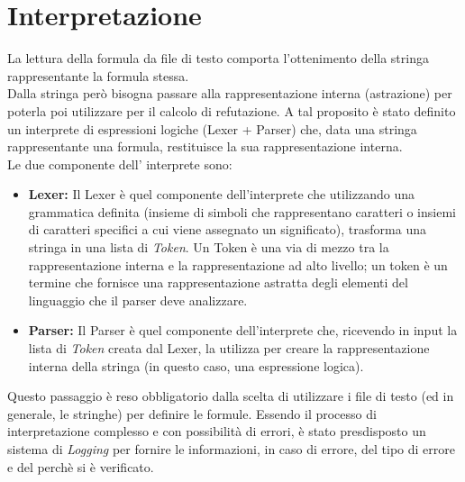 \documentclass[\main/tesi.tex]{subfiles}
\begin{document}
\section{Interpretazione}
La lettura della formula da file di testo comporta l'ottenimento della stringa rappresentante la formula stessa. \\
Dalla stringa però bisogna passare alla rappresentazione interna (astrazione) per poterla poi utilizzare per il calcolo di refutazione. A tal proposito è stato definito un interprete di espressioni logiche (Lexer + Parser) che, data una stringa rappresentante una formula, restituisce la sua rappresentazione interna. \\
Le due componente dell' interprete sono:
\begin{itemize}
  \item \textbf{Lexer:} Il Lexer è quel componente dell'interprete che utilizzando una grammatica definita (insieme di simboli che rappresentano caratteri o insiemi di caratteri specifici a cui viene assegnato un significato), trasforma una stringa in una lista di \textit{Token}. Un Token è una via di mezzo tra la rappresentazione interna e la rappresentazione ad alto livello; un token è un termine che fornisce una rappresentazione astratta degli elementi del linguaggio che il parser deve analizzare.
  \item \textbf{Parser:} Il Parser è quel componente dell'interprete che, ricevendo in input la lista di \textit{Token} creata dal Lexer, la utilizza per creare la rappresentazione interna della stringa (in questo caso, una espressione logica).
\end{itemize}
Questo passaggio è reso obbligatorio dalla scelta di utilizzare i file di testo (ed in generale, le stringhe) per definire le formule.
Essendo il processo di interpretazione complesso e con possibilità di errori, è stato presdisposto un sistema di \textit{Logging} per fornire le informazioni, in caso di errore, del tipo di errore e del perchè si è verificato. \\

\newpage
\end{document}
